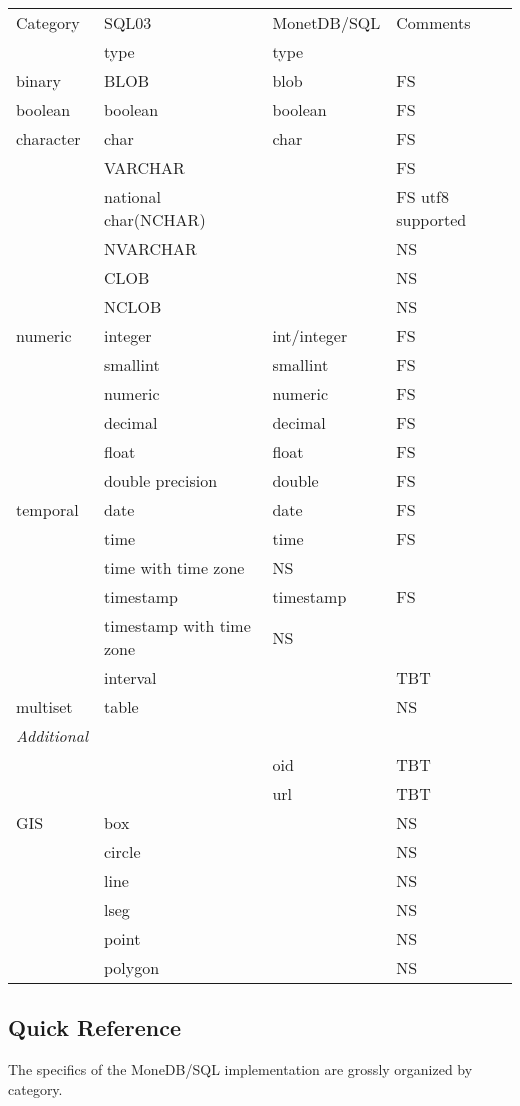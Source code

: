 \documentclass[10pt,twocolumn,fleqn]{article}
\begin{document}
\begin{tabular}{l |l | l | l}
Category	& SQL03 & MonetDB/SQL & Comments\\
		& type	& type	&	\\\hline
binary		& BLOB	& blob	& FS 	\\
boolean		& boolean& boolean& FS		\\
character	& char	& char	& FS	\\
		& VARCHAR &	& FS	\\
		& national char(NCHAR)&& FS utf8 supported\\
		& NVARCHAR&	& 	NS\\
		& CLOB	&	&	NS\\
		& NCLOB	&	&	NS\\
numeric		& integer& int/integer & FS\\
		& smallint&smallint& FS	\\
		&numeric &numeric& FS	\\
		& decimal&decimal& FS	 \\
		& float & float& FS	\\
		& double precision& double& FS	\\
temporal	& date & date& FS	\\
		& time & time& FS \\
		& time with time zone& NS\\
		& timestamp& timestamp& FS	\\
		& timestamp with time zone& NS\\
		& interval &	& TBT\\\hline
multiset	& table & & NS \\
{\em Additional}&	&	&	\\
		&	& oid	& TBT\\
		&	& url	& TBT\\
GIS & box	& & NS\\
		&circle	& & NS\\
		&line	& & NS\\
		&lseg	& & NS\\
		&point	& & NS\\
		&polygon & & NS\\
\end{tabular}

\subsection{Quick Reference}
The specifics of the MoneDB/SQL implementation are grossly organized
by category.
\end{document}
